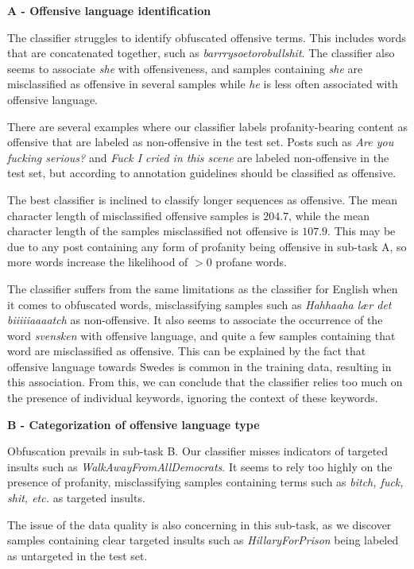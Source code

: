 \documentclass{article}
\begin{document}
\textbf{A - Offensive language identification}

The classifier struggles to identify obfuscated offensive terms. This includes words that are concatenated together, such as \textit{barrrysoetorobullshit}. The classifier also seems to associate \textit{she} with offensiveness, and samples containing \textit{she} are misclassified as offensive in several samples while \textit{he} is less often associated with offensive language. 

There are several examples where our classifier labels profanity-bearing content as offensive that are labeled as non-offensive in the test set. Posts such as \textit{Are you fucking serious?} and \textit{Fuck I cried in this scene} are labeled non-offensive in the test set, but according to annotation guidelines should  be classified as offensive. 

The best classifier is inclined to classify longer sequences as offensive. The mean character length of misclassified offensive samples is $204.7$, while the mean character length of the samples misclassified not offensive is $107.9$. This may be due to any post containing any form of profanity being offensive in sub-task A, so more words increase the likelihood of $>0$ profane words.

The classifier suffers from the same limitations as the classifier for English when it comes to obfuscated words, misclassifying samples such as \textit{Hahhaaha lær det biiiiiaaaatch} as non-offensive. It also seems to associate the occurrence of the word \textit{svensken} with offensive language, and quite a few samples containing that word are misclassified as offensive. This can be explained by the fact that offensive language towards Swedes is common in the training data, resulting in this association. From this, we can conclude that the classifier relies too much on the presence of individual keywords, ignoring  the context of these keywords. 

\textbf{B - Categorization of offensive language type}

Obfuscation prevails in sub-task B. Our classifier misses indicators of targeted insults such as \textit{WalkAwayFromAllDemocrats}. It seems to rely too highly on the presence of profanity, misclassifying samples containing terms such as \textit{bitch, fuck, shit, etc.} as targeted insults. 

The issue of the data quality is also concerning in this sub-task, as we discover samples containing clear targeted insults such as \textit{HillaryForPrison} being labeled as untargeted in the test set. 
\end{document}
